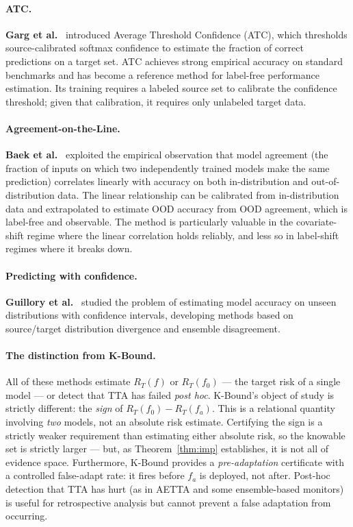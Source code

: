 \paragraph{ATC.}
\textbf{Garg et al.}~\cite{garg2022atc} introduced Average Threshold
Confidence (ATC), which thresholds source-calibrated softmax confidence to
estimate the fraction of correct predictions on a target set.
ATC achieves strong empirical accuracy on standard benchmarks and has become
a reference method for label-free performance estimation.
Its training requires a labeled source set to calibrate the confidence
threshold; given that calibration, it requires only unlabeled target data.

\paragraph{Agreement-on-the-Line.}
\textbf{Baek et al.}~\cite{baek2022agreement} exploited the empirical
observation that model agreement (the fraction of inputs on which two
independently trained models make the same prediction) correlates linearly
with accuracy on both in-distribution and out-of-distribution data.
The linear relationship can be calibrated from in-distribution data and
extrapolated to estimate OOD accuracy from OOD agreement, which is label-free
and observable.
The method is particularly valuable in the covariate-shift regime where the
linear correlation holds reliably, and less so in label-shift regimes where
it breaks down.

\paragraph{Predicting with confidence.}
\textbf{Guillory et al.}~\cite{guillory2021predicting} studied the problem
of estimating model accuracy on unseen distributions with confidence
intervals, developing methods based on source/target distribution divergence
and ensemble disagreement.

\paragraph{The distinction from K-Bound.}
All of these methods estimate $R_T(f)$ or $R_T(f_0)$ --- the target risk of
a single model --- or detect that TTA has failed \emph{post hoc}.
K-Bound's object of study is strictly different: the \emph{sign} of
$R_T(f_0) - R_T(f_a)$.
This is a relational quantity involving \emph{two} models, not an absolute
risk estimate.
Certifying the sign is a strictly weaker requirement than estimating either
absolute risk, so the knowable set is strictly larger --- but, as
Theorem~\ref{thm:imp} establishes, it is not all of evidence space.
Furthermore, K-Bound provides a \emph{pre-adaptation} certificate with a
controlled false-adapt rate: it fires before $f_a$ is deployed, not after.
Post-hoc detection that TTA has hurt (as in AETTA and some ensemble-based
monitors) is useful for retrospective analysis but cannot prevent a false
adaptation from occurring.


